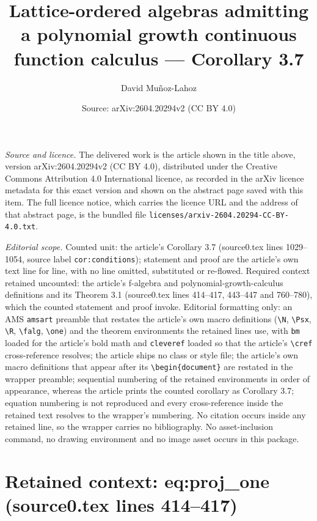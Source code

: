 \documentclass[10pt,a4paper]{amsart}
\title[Lattice-ordered algebras admitting a polynomial growth continuous function calculus]{Lattice-ordered algebras admitting a polynomial growth continuous function calculus — Corollary 3.7}
\author{David Mu\~noz-Lahoz}
\date{Source: arXiv:2604.20294v2 (CC BY 4.0)}
\theoremstyle{plain}
\theoremstyle{definition}
\theoremstyle{remark}
\begin{document}
\maketitle

\noindent\emph{Source and licence.} The delivered work is the article shown in the title above, version arXiv:2604.20294v2 (CC BY 4.0), distributed under the Creative Commons Attribution 4.0 International licence, as recorded in the arXiv licence metadata for this exact version and shown on the abstract page saved with this item. The full licence notice, which carries the licence URL and the address of that abstract page, is the bundled file \texttt{licenses/arxiv-2604.20294-CC-BY-4.0.txt}.\par\smallskip

\noindent\textit{Editorial scope.} Counted unit: the article's Corollary 3.7 (source0.tex lines 1029--1054, source label \texttt{cor:conditions}); statement and proof are the article's own text line for line, with no line omitted, substituted or re-flowed. Required context retained uncounted: the article's f-algebra and polynomial-growth-calculus definitions and its Theorem 3.1 (source0.tex lines 414--417, 443--447 and 760--780), which the counted statement and proof invoke. Editorial formatting only: an AMS \texttt{amsart} preamble that restates the article's own macro definitions (\texttt{\textbackslash N}, \texttt{\textbackslash Psx}, \texttt{\textbackslash R}, \texttt{\textbackslash falg}, \texttt{\textbackslash one}) and the theorem environments the retained lines use, with \texttt{bm} loaded for the article's bold math and \texttt{cleveref} loaded so that the article's \texttt{\textbackslash cref} cross-reference resolves; the article ships no class or style file; the article's own macro definitions that appear after its \texttt{\textbackslash begin\{document\}} are restated in the wrapper preamble; sequential numbering of the retained environments in order of appearance, whereas the article prints the counted corollary as Corollary 3.7; equation numbering is not reproduced and every cross-reference inside the retained text resolves to the wrapper's numbering. No citation occurs inside any retained line, so the wrapper carries no bibliography. No asset-inclusion command, no drawing environment and no image asset occurs in this package.


\section*{Retained context: eq:proj\_one (source0.tex lines 414--417)}
\end{document}

